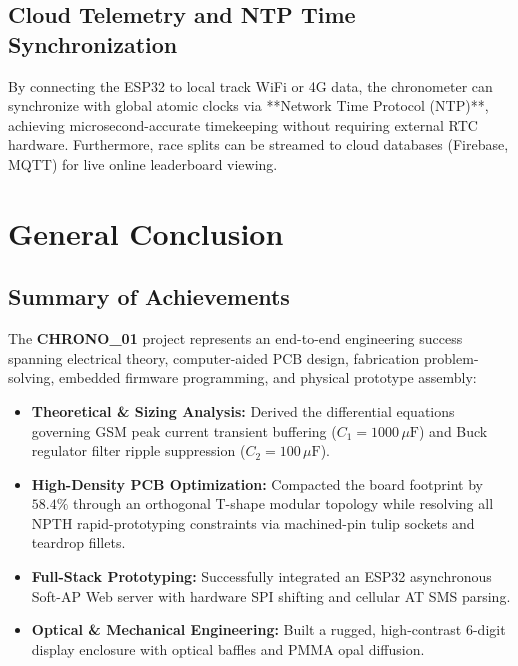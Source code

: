 \documentclass[12pt,a4paper,oneside]{report}
\begin{document}
\section{Cloud Telemetry and NTP Time Synchronization}
By connecting the ESP32 to local track WiFi or 4G data, the chronometer can synchronize with global atomic clocks via **Network Time Protocol (NTP)**, achieving microsecond-accurate timekeeping without requiring external RTC hardware. Furthermore, race splits can be streamed to cloud databases (Firebase, MQTT) for live online leaderboard viewing.

\chapter*{General Conclusion}

\section*{Summary of Achievements}
The \textbf{CHRONO\_01} project represents an end-to-end engineering success spanning electrical theory, computer-aided PCB design, fabrication problem-solving, embedded firmware programming, and physical prototype assembly:
\begin{itemize}
    \item \textbf{Theoretical \& Sizing Analysis:} Derived the differential equations governing GSM peak current transient buffering ($C_1 = 1000\,\mu\text{F}$) and Buck regulator filter ripple suppression ($C_2 = 100\,\mu\text{F}$).
    \item \textbf{High-Density PCB Optimization:} Compacted the board footprint by $58.4\%$ through an orthogonal T-shape modular topology while resolving all NPTH rapid-prototyping constraints via machined-pin tulip sockets and teardrop fillets.
    \item \textbf{Full-Stack Prototyping:} Successfully integrated an ESP32 asynchronous Soft-AP Web server with hardware SPI shifting and cellular AT SMS parsing.
    \item \textbf{Optical \& Mechanical Engineering:} Built a rugged, high-contrast 6-digit display enclosure with optical baffles and PMMA opal diffusion.
\end{itemize}
\end{document}
